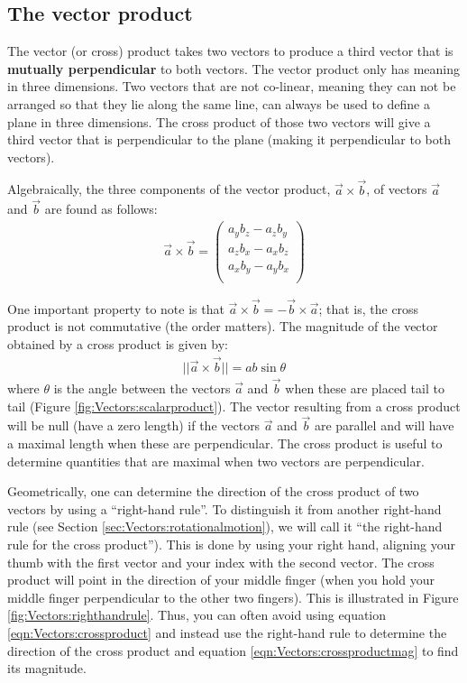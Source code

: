 \subsection{The vector product}
\label{sec:Vectors:vectorproduct}
The vector (or cross) product takes two vectors to produce a third vector that is \textbf{mutually perpendicular} to both vectors. The vector product only has meaning in three dimensions. Two vectors that are not co-linear, meaning they can not be arranged so that they lie along the same line, can always be used to define a plane in three dimensions. The cross product of those two vectors will give a third vector that is perpendicular to the plane (making it perpendicular to both vectors). 

Algebraically, the three components of the vector product, $\vec a\times \vec b$, of vectors $\vec a$ and $\vec b$ are found as follows:
\begin{align}
\label{eqn:Vectors:crossproduct}
\vec a \times \vec b =\begin{pmatrix}
           a_yb_z - a_z b_y\\
           a_zb_x - a_x b_z\\
           a_xb_y - a_y b_x\\
         \end{pmatrix}
\end{align}

One important property to note is that $\vec a \times \vec b = -\vec b \times \vec a$; that is, the cross product is not commutative (the order matters). The magnitude of the vector obtained by a cross product is given by:
\begin{align}
\label{eqn:Vectors:crossproductmag}
||\vec a \times \vec b ||=ab\sin\theta
\end{align}
where $\theta$ is the angle between the vectors $\vec a$ and $\vec b$ when these are placed tail to tail (Figure \ref{fig:Vectors:scalarproduct}). The vector resulting from a cross product will be null (have a zero length) if the vectors $\vec a$ and $\vec b$ are parallel and will have a maximal length when these are perpendicular. The cross product is useful to determine quantities that are maximal when two vectors are perpendicular. 

Geometrically, one can determine the direction of the cross product of two vectors by using a ``right-hand rule''. To distinguish it from another right-hand rule (see Section \ref{sec:Vectors:rotationalmotion}), we will call it ``the right-hand rule for the cross product''). This is done by using your right hand, aligning your thumb with the first vector and your index with the second vector. The cross product will point in the direction of your middle finger (when you hold your middle finger perpendicular to the other two fingers). This is illustrated in Figure \ref{fig:Vectors:righthandrule}. Thus, you can often avoid using equation \ref{eqn:Vectors:crossproduct} and instead use the right-hand rule to determine the direction of the cross product and equation \ref{eqn:Vectors:crossproductmag} to find its magnitude.


